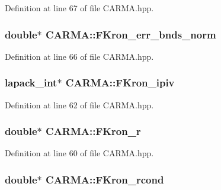 Definition at line 67 of file C\-A\-R\-M\-A.\-hpp.

\hypertarget{class_c_a_r_m_a_a859299a912a8613c5143b8b9878b5842}{
\subsubsection[{F\-Kron\-\_\-err\-\_\-bnds\-\_\-norm}]{\setlength{\rightskip}{0pt plus 5cm}double$\ast$ C\-A\-R\-M\-A\-::\-F\-Kron\-\_\-err\-\_\-bnds\-\_\-norm}}\label{class_c_a_r_m_a_a859299a912a8613c5143b8b9878b5842}


Definition at line 66 of file C\-A\-R\-M\-A.\-hpp.

\hypertarget{class_c_a_r_m_a_afaf0d0b033ee891862d59a7800d9cdaf}{
\subsubsection[{F\-Kron\-\_\-ipiv}]{\setlength{\rightskip}{0pt plus 5cm}lapack\-\_\-int$\ast$ C\-A\-R\-M\-A\-::\-F\-Kron\-\_\-ipiv}}\label{class_c_a_r_m_a_afaf0d0b033ee891862d59a7800d9cdaf}


Definition at line 62 of file C\-A\-R\-M\-A.\-hpp.

\hypertarget{class_c_a_r_m_a_a8767db54a4a42729310a11e1fefc8fba}{
\subsubsection[{F\-Kron\-\_\-r}]{\setlength{\rightskip}{0pt plus 5cm}double$\ast$ C\-A\-R\-M\-A\-::\-F\-Kron\-\_\-r}}\label{class_c_a_r_m_a_a8767db54a4a42729310a11e1fefc8fba}


Definition at line 60 of file C\-A\-R\-M\-A.\-hpp.

\hypertarget{class_c_a_r_m_a_a4d0801b15644b2e5b0580b0688119737}{
\subsubsection[{F\-Kron\-\_\-rcond}]{\setlength{\rightskip}{0pt plus 5cm}double$\ast$ C\-A\-R\-M\-A\-::\-F\-Kron\-\_\-rcond}}\label{class_c_a_r_m_a_a4d0801b15644b2e5b0580b0688119737}


